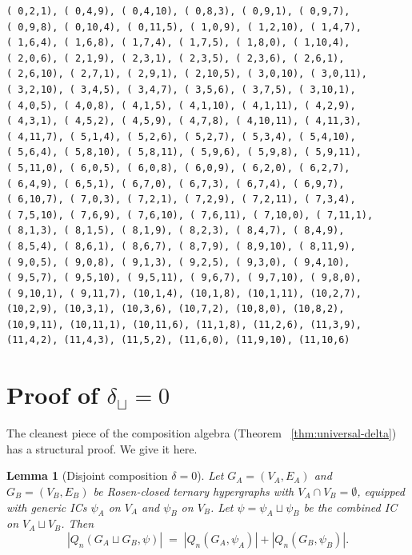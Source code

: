 \documentclass[12pt,a4paper]{article}
\newtheorem{lemma}[theorem]{Lemma}
\theoremstyle{definition}
\theoremstyle{remark}
\newcommand{\Qn}{Q_n}
\begin{document}
\begin{verbatim}
( 0,2,1), ( 0,4,9), ( 0,4,10), ( 0,8,3), ( 0,9,1), ( 0,9,7),
( 0,9,8), ( 0,10,4), ( 0,11,5), ( 1,0,9), ( 1,2,10), ( 1,4,7),
( 1,6,4), ( 1,6,8), ( 1,7,4), ( 1,7,5), ( 1,8,0), ( 1,10,4),
( 2,0,6), ( 2,1,9), ( 2,3,1), ( 2,3,5), ( 2,3,6), ( 2,6,1),
( 2,6,10), ( 2,7,1), ( 2,9,1), ( 2,10,5), ( 3,0,10), ( 3,0,11),
( 3,2,10), ( 3,4,5), ( 3,4,7), ( 3,5,6), ( 3,7,5), ( 3,10,1),
( 4,0,5), ( 4,0,8), ( 4,1,5), ( 4,1,10), ( 4,1,11), ( 4,2,9),
( 4,3,1), ( 4,5,2), ( 4,5,9), ( 4,7,8), ( 4,10,11), ( 4,11,3),
( 4,11,7), ( 5,1,4), ( 5,2,6), ( 5,2,7), ( 5,3,4), ( 5,4,10),
( 5,6,4), ( 5,8,10), ( 5,8,11), ( 5,9,6), ( 5,9,8), ( 5,9,11),
( 5,11,0), ( 6,0,5), ( 6,0,8), ( 6,0,9), ( 6,2,0), ( 6,2,7),
( 6,4,9), ( 6,5,1), ( 6,7,0), ( 6,7,3), ( 6,7,4), ( 6,9,7),
( 6,10,7), ( 7,0,3), ( 7,2,1), ( 7,2,9), ( 7,2,11), ( 7,3,4),
( 7,5,10), ( 7,6,9), ( 7,6,10), ( 7,6,11), ( 7,10,0), ( 7,11,1),
( 8,1,3), ( 8,1,5), ( 8,1,9), ( 8,2,3), ( 8,4,7), ( 8,4,9),
( 8,5,4), ( 8,6,1), ( 8,6,7), ( 8,7,9), ( 8,9,10), ( 8,11,9),
( 9,0,5), ( 9,0,8), ( 9,1,3), ( 9,2,5), ( 9,3,0), ( 9,4,10),
( 9,5,7), ( 9,5,10), ( 9,5,11), ( 9,6,7), ( 9,7,10), ( 9,8,0),
( 9,10,1), ( 9,11,7), (10,1,4), (10,1,8), (10,1,11), (10,2,7),
(10,2,9), (10,3,1), (10,3,6), (10,7,2), (10,8,0), (10,8,2),
(10,9,11), (10,11,1), (10,11,6), (11,1,8), (11,2,6), (11,3,9),
(11,4,2), (11,4,3), (11,5,2), (11,6,0), (11,9,10), (11,10,6)
\end{verbatim}

\section{Proof of $\delta_{\sqcup} = 0$}\label{app:proofs}

The cleanest piece of the composition algebra (Theorem~%
\ref{thm:universal-delta}) has a structural proof. We give it here.

\begin{lemma}[Disjoint composition $\delta = 0$]\label{lem:disjoint-delta}
Let $G_A = (V_A, E_A)$ and $G_B = (V_B, E_B)$ be Rosen-closed
ternary hypergraphs with $V_A \cap V_B = \emptyset$, equipped with
generic ICs $\psi_A$ on $V_A$ and $\psi_B$ on $V_B$. Let
$\psi = \psi_A \sqcup \psi_B$ be the combined IC on $V_A \sqcup V_B$.
Then
\[
|\Qn(G_A \sqcup G_B, \psi)| \;=\; |\Qn(G_A, \psi_A)| + |\Qn(G_B, \psi_B)|.
\]
\end{lemma}
\end{document}
